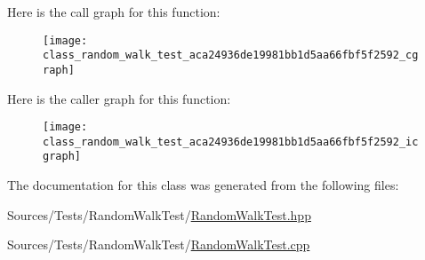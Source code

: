 Here is the call graph for this function\+:
\nopagebreak
\begin{figure}[H]
\begin{center}
\leavevmode
\texttt{[image: class\_random\_walk\_test\_aca24936de19981bb1d5aa66fbf5f2592\_cgraph]}
\end{center}
\end{figure}




Here is the caller graph for this function\+:\nopagebreak
\begin{figure}[H]
\begin{center}
\leavevmode
\texttt{[image: class\_random\_walk\_test\_aca24936de19981bb1d5aa66fbf5f2592\_icgraph]}
\end{center}
\end{figure}




The documentation for this class was generated from the following files\+:\begin{DoxyCompactItemize}
\item 
Sources/\+Tests/\+Random\+Walk\+Test/\hyperlink{_random_walk_test_8hpp}{Random\+Walk\+Test.\+hpp}\item 
Sources/\+Tests/\+Random\+Walk\+Test/\hyperlink{_random_walk_test_8cpp}{Random\+Walk\+Test.\+cpp}\end{DoxyCompactItemize}
